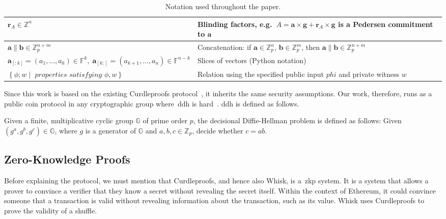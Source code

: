 \begin{table*}[!htb]
\begin{tabular}{|l|l|}
        \hline
        $\mathbf{r}_A\in\mathbb{Z}^n$ & Blinding factors, e.g.\ $A=\mathbf{a}\times\mathbf{g} + \mathbf{r}_A \times \mathbf{g}$ is a Pedersen commitment to $\mathbf{a}$ \\
        \hline
        $\mathbf{a}\parallel \mathbf{b}\in\mathbb{Z}_p^{n+m}$
        & Concatenation: if $\mathbf{a}\in\mathbb{Z}_p^n$, $\mathbf{b}\in\mathbb{Z}_p^m$, then $\mathbf{a}\parallel \mathbf{b}\in\mathbb{Z}_p^{n+m}$ \\
        \hline
        $\mathbf{a}_{[:k]}=(a_1,\dots,a_k)\in\mathbb{F}^k, \; \mathbf{a}_{[k:]}=(a_{k+1},\dots,a_n)\in\mathbb{F}^{n-k}$
        & Slices of vectors (Python notation) \\
        \hline
        $\left\{\phi; w\middle|\textit{ properties satisfying }\phi,w\right\}$
        & Relation using the specified public input $phi$ and private witness $w$ \\
        \hline
    \end{tabular}
    \caption{Notation used throughout the paper.}
    \label{tab:notation}
\end{table*}


Since this work is based on the existing Curdleproofs protocol~\cite{Curdleproofs}, it inherits the same security assumptions.
Our work, therefore, runs as a public coin protocol in any cryptographic group where~\gls{ddh} is hard~\cite{10.1007/BFb0054851}.
\gls{ddh} is defined as follows.

\begin{definition}[DDH]
 Given a finite, multiplicative cyclic group $\mathbb{G}$ of prime order $p$, the decisional Diffie-Hellman problem is defined as follows: Given $(g^a,g^b,g^c)\in\mathbb{G}$, where $g$ is a generator of $\mathbb{G}$ and $a,b,c\in\mathbb{Z}_p$, decide whether $c=ab$.
\end{definition}

\subsection{Zero-Knowledge Proofs}\label{sec:background-zkps}
Before explaining the protocol, we must mention that Curdleproofs, and hence also Whisk, is a~\gls{zkp} system.
It is a system that allows a prover to convince a verifier that they know a secret without revealing the secret itself.
Within the context of Ethereum, it could convince someone that a transaction is valid without revealing information about the transaction, such as its value.
Whisk uses Curdleproofs to prove the validity of a shuffle.

